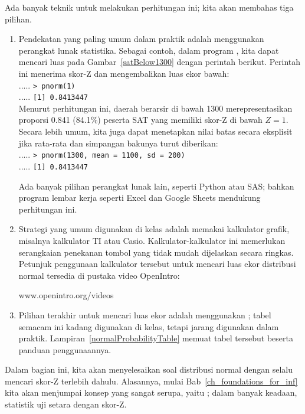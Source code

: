 Ada banyak teknik untuk melakukan perhitungan ini; kita akan membahas
tiga pilihan.
\begin{enumerate}
\item
    Pendekatan yang paling umum dalam praktik adalah menggunakan
    perangkat lunak statistika.
    Sebagai contoh, dalam program \R{}, kita dapat mencari luas
    pada Gambar~\ref{satBelow1300} dengan perintah berikut.
    Perintah ini menerima skor-Z dan mengembalikan luas ekor bawah: \\
    {\color{white}.....}%
        \texttt{> pnorm(1)} \\
    {\color{white}.....}%
        \texttt{[1] 0.8413447} \\
    Menurut perhitungan ini, daerah berarsir di bawah 1300
    merepresentasikan proporsi 0.841 (84.1\%) peserta SAT
    yang memiliki skor-Z di bawah $Z = 1$.
    Secara lebih umum, kita juga dapat menetapkan nilai batas secara
    eksplisit jika rata-rata dan simpangan bakunya turut diberikan: \\
    {\color{white}.....}%
        \texttt{> pnorm(1300, mean = 1100, sd = 200)} \\
    {\color{white}.....}%
        \texttt{[1] 0.8413447} %


    Ada banyak pilihan perangkat lunak lain, seperti Python atau SAS;
    bahkan program lembar kerja seperti Excel dan Google Sheets
    mendukung perhitungan ini.
\item
    Strategi yang umum digunakan di kelas adalah memakai kalkulator
    grafik, misalnya kalkulator TI atau Casio.
    Kalkulator-kalkulator ini memerlukan serangkaian penekanan tombol
    yang tidak mudah dijelaskan secara ringkas.
    Petunjuk penggunaan kalkulator tersebut untuk mencari luas ekor
    distribusi normal tersedia di pustaka video OpenIntro:
    \begin{center}
        {www.openintro.org/videos}
    \end{center}
\item
    Pilihan terakhir untuk mencari luas ekor adalah menggunakan
    ; tabel semacam ini
    kadang digunakan di kelas, tetapi jarang digunakan dalam praktik.
    Lampiran~\ref{normalProbabilityTable} memuat tabel tersebut
    beserta panduan penggunaannya.
\end{enumerate}
Dalam bagian ini, kita akan menyelesaikan soal distribusi normal
dengan selalu mencari skor-Z terlebih dahulu.
Alasannya, mulai Bab~\ref{ch_foundations_for_inf} kita akan menjumpai
konsep yang sangat serupa, yaitu
; dalam banyak keadaan,
statistik uji setara dengan skor-Z.

